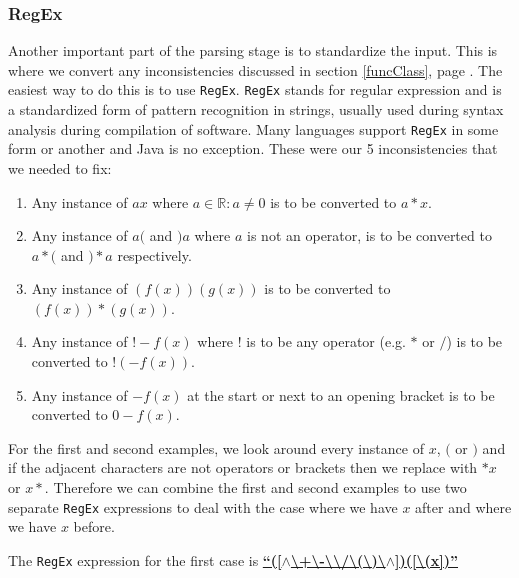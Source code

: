 \documentclass[../../../../../main.tex]{subfiles}
\begin{document}
\subsubsection{RegEx}
Another important part of the parsing stage is to standardize the input. This is where we convert any inconsistencies discussed in section \ref{funcClass}, page \pageref{funcClass}. The easiest way to do this is to use \texttt{RegEx\cite{regex}}. \texttt{RegEx} stands for regular expression and is a standardized form of pattern recognition in strings, usually used during syntax analysis during compilation of software. Many languages support \texttt{RegEx} in some form or another and Java is no exception. These were our 5 inconsistencies that we needed to fix:
\begin{enumerate}
	\item Any instance of $ax$ where $a \in  \mathbb{R} : a \neq 0$ is to be converted to $a*x$.
	\item Any instance of $a($ and $)a$ where $a$ is not an operator, is to be converted to $a*($ and $)*a$ respectively.
	\item Any instance of $(f(x))(g(x))$ is to be converted to $(f(x))*(g(x))$.
	\item Any instance of $!-f(x)$ where $!$ is to be any operator (e.g. $*$ or $/$) is to be converted to $! (-f(x))$.
	\item Any instance of $-f(x)$ at the start or next to an opening bracket is to be converted to $0 - f(x)$.
\end{enumerate}
For the first and second examples, we look around every instance of $x$, $($ or $)$ and if the adjacent characters are not operators or brackets then we replace with $*x$ or $x*$. Therefore we can combine the first and second examples to use two separate \texttt{RegEx} expressions to deal with the case where we have $x$ after and where we have $x$ before.\par
The \texttt{RegEx} expression for the first case is
\textbf{\underline{``([$\wedge$\textbackslash+\textbackslash-\textbackslash*\textbackslash/\textbackslash(\textbackslash)\textbackslash$\wedge$])([\textbackslash(x])''}}
\end{document}
